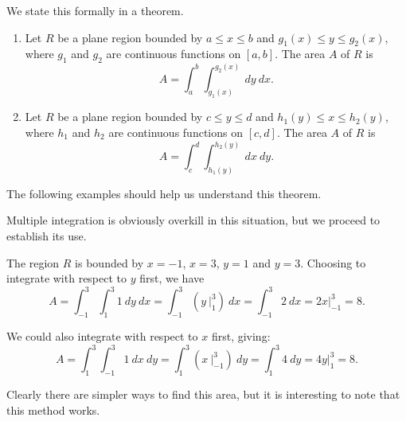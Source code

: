 We state this formally in a theorem.

{\begin{enumerate}
	\item Let $R$ be a plane region bounded by $a\leq x\leq b$ and $g_1(x)\leq y\leq g_2(x)$, where $g_1$ and $g_2$ are continuous functions on $[a,b]$. The area $A$ of $R$ is
	\[A = \int_a^b\int_{g_1(x)}^{g_2(x)} \ dy\ dx.\]
	\item Let $R$ be a plane region bounded by $c\leq y\leq d$ and $h_1(y)\leq x\leq h_2(y)$, where $h_1$ and $h_2$ are continuous functions on $[c,d]$. The area $A$ of $R$ is
	\[A = \int_c^d\int_{h_1(y)}^{h_2(y)} \ dx\ dy.\]
\end{enumerate}}

The following examples should help us understand this theorem.

{Multiple integration is obviously overkill in this situation, but we proceed to establish its use.


The region $R$ is bounded by $x=-1$, $x=3$, $y=1$ and $y=3$. Choosing to integrate with respect to $y$ first, we have 
\[
 A = \int_{-1}^3\int_1^3 1\ dy\ dx = \int_{-1}^3 \left(y\ \Big|_1^3\right)\ dx
 = \int_{-1}^3 2\ dx = 2x\Big|_{-1}^3=8.
\]

We could also integrate with respect to $x$ first, giving:
\[
 A = \int_1^3\int_{-1}^3 1\ dx \ dy =\int_1^3 \left(x\ \Big|_{-1}^3\right)\ dy
 = \int_1^3 4\ dy = 4y\Big|_1^3 = 8.
\]

Clearly there are simpler ways to find this area, but it is interesting to note that this method works.}

